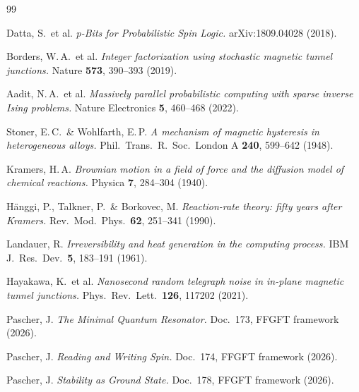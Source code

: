 	\newpage
	\begin{thebibliography}{99}
		
		Datta, S.\ et al.
		\textit{p-Bits for Probabilistic Spin Logic.}
		arXiv:1809.04028 (2018).
		
		Borders, W.\,A.\ et al.
		\textit{Integer factorization using stochastic magnetic tunnel junctions.}
		Nature \textbf{573}, 390--393 (2019).
		
		Aadit, N.\,A.\ et al.
		\textit{Massively parallel probabilistic computing with sparse inverse
			Ising problems.}
		Nature Electronics \textbf{5}, 460--468 (2022).
		
		Stoner, E.\,C.\ \& Wohlfarth, E.\,P.
		\textit{A mechanism of magnetic hysteresis in heterogeneous alloys.}
		Phil.\ Trans.\ R.\ Soc.\ London A \textbf{240}, 599--642 (1948).
		
		Kramers, H.\,A.
		\textit{Brownian motion in a field of force and the diffusion model
			of chemical reactions.}
		Physica \textbf{7}, 284--304 (1940).
		
		Hänggi, P., Talkner, P.\ \& Borkovec, M.
		\textit{Reaction-rate theory: fifty years after Kramers.}
		Rev.\ Mod.\ Phys.\ \textbf{62}, 251--341 (1990).
		
		Landauer, R.
		\textit{Irreversibility and heat generation in the computing process.}
		IBM J.\ Res.\ Dev.\ \textbf{5}, 183--191 (1961).
		
		Hayakawa, K.\ et al.
		\textit{Nanosecond random telegraph noise in in-plane magnetic
			tunnel junctions.}
		Phys.\ Rev.\ Lett.\ \textbf{126}, 117202 (2021).
		
		Pascher, J.
		\textit{The Minimal Quantum Resonator.}
		Doc.~173, FFGFT framework (2026).
		
		Pascher, J.
		\textit{Reading and Writing Spin.}
		Doc.~174, FFGFT framework (2026).
		
		Pascher, J.
		\textit{Stability as Ground State.}
		Doc.~178, FFGFT framework (2026).
		
	\end{thebibliography}
